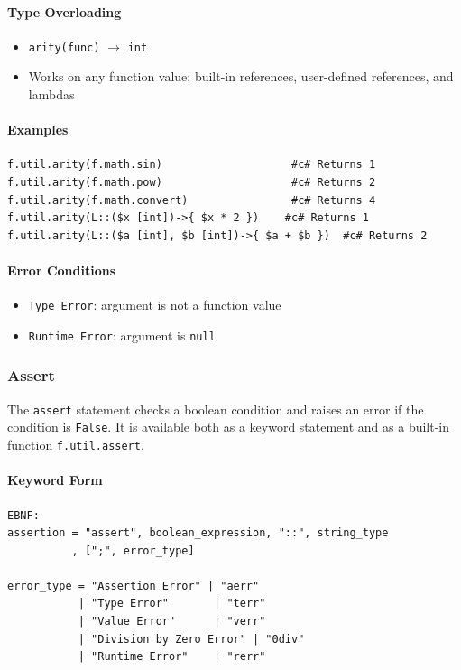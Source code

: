 \paragraph{Type Overloading}
\begin{itemize}
\item \texttt{arity(func)} $\rightarrow$ \texttt{int}
\item Works on any function value: built-in references, user-defined references, and lambdas
\end{itemize}

\paragraph{Examples}
\begin{verbatim}
f.util.arity(f.math.sin)                    #c# Returns 1
f.util.arity(f.math.pow)                    #c# Returns 2
f.util.arity(f.math.convert)                #c# Returns 4
f.util.arity(L::($x [int])->{ $x * 2 })    #c# Returns 1
f.util.arity(L::($a [int], $b [int])->{ $a + $b })  #c# Returns 2
\end{verbatim}

\paragraph{Error Conditions}
\begin{itemize}
\item \texttt{Type Error}: argument is not a function value
\item \texttt{Runtime Error}: argument is \texttt{null}
\end{itemize}

\subsubsection{Assert}
\label{sec:assert}
The \texttt{assert} statement checks a boolean condition and raises an error if the condition is \texttt{False}. It is available both as a keyword statement and as a built-in function \texttt{f.util.assert}.

\paragraph{Keyword Form}
\begin{verbatim}
EBNF:
assertion = "assert", boolean_expression, "::", string_type
          , [";", error_type]

error_type = "Assertion Error" | "aerr"
           | "Type Error"       | "terr"
           | "Value Error"      | "verr"
           | "Division by Zero Error" | "0div"
           | "Runtime Error"    | "rerr"
\end{verbatim}

